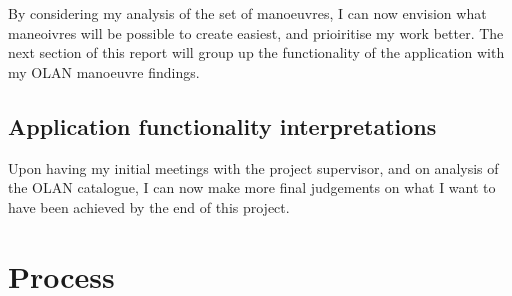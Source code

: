 By considering my analysis of the set of manoeuvres, I can now envision what maneoivres will be possible to create easiest, and prioiritise my work better. The next section of this report will group up the functionality of the application with my OLAN manoeuvre findings.

\subsection{Application functionality interpretations}
Upon having my initial meetings with the project supervisor, and on analysis of the OLAN catalogue, I can now make more final judgements on what I want to have been achieved by the end of this project. 



\section{Process}


